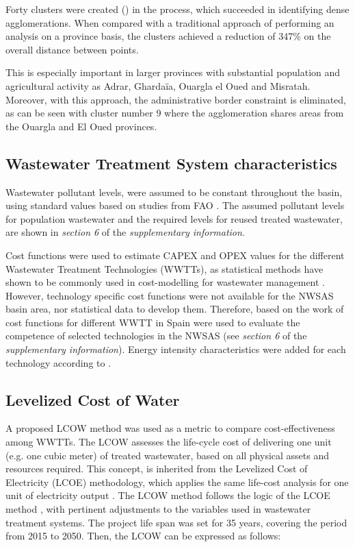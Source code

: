 Forty clusters were created () in the process, which succeeded in identifying dense agglomerations. When compared with a traditional approach of performing an analysis on a province basis, the clusters achieved a reduction of 347\% on the overall distance between points.

This is especially important in larger provinces with substantial population and agricultural activity as Adrar, Ghardaïa, Ouargla el Oued and Misratah. Moreover, with this approach, the administrative border constraint is eliminated, as can be seen with cluster number 9 where the agglomeration shares areas from the Ouargla and El Oued provinces.

\subsection{Wastewater Treatment System characteristics}
Wastewater pollutant levels, were assumed to be constant throughout the basin, using standard values based on studies from FAO \cite{fao1985water}. The assumed pollutant levels for population wastewater and the required levels for reused treated wastewater, are shown in \textit{section 6} of the \textit{supplementary information}.

Cost functions were used to estimate CAPEX and OPEX values for the different Wastewater Treatment Technologies (WWTTs), as statistical methods have shown to be commonly used in cost-modelling for wastewater management \cite{Costmodellingwastewater2011,Assessmentwastewatertreatment2012,Economicfeasibility2012}. However, technology specific cost functions were not available for the NWSAS basin area, nor statistical data to develop them. Therefore, based on the work of \citet{Assessmentwastewatertreatment2012} cost functions for different WWTT in Spain were used to evaluate the competence of selected technologies in the NWSAS (see \textit{section 6} of the \textit{supplementary information}). Energy intensity characteristics were added for each technology according to \cite{Energypatternanalysis2012,ComparativeAnalysisEnergy2017}.

\subsection{Levelized Cost of Water}
A proposed LCOW method was used as a metric to compare cost-effectiveness among WWTTs. The LCOW assesses the life-cycle cost of delivering one unit (e.g. one cubic meter) of treated wastewater, based on all physical assets and resources required. This concept, is inherited from the Levelized Cost of Electricity (LCOE) methodology, which applies the same life-cost analysis for one unit of electricity output \cite{prospectscostcompetitive2013}. The LCOW method follows the logic of the LCOE method \cite{prospectscostcompetitive2013,GeospatialLevelizedCost2015}, with pertinent adjustments to the variables used in wastewater treatment systems. The project life span was set for 35 years, covering the period from 2015 to 2050. Then, the LCOW can be expressed as follows:

